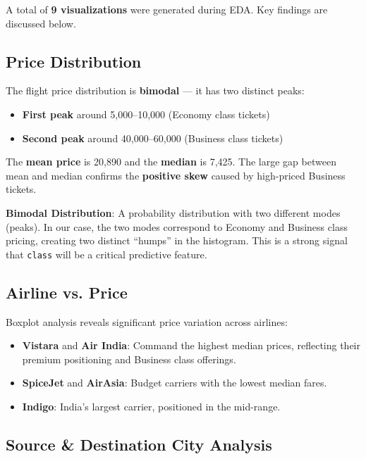 \documentclass[12pt, a4paper]{article}
\newcommand{\rupee}{\text{₹}}
\begin{document}
A total of \textbf{9 visualizations} were generated during EDA. Key findings are discussed below.

\subsection{Price Distribution}

The flight price distribution is \textbf{bimodal} — it has two distinct peaks:
\begin{itemize}[leftmargin=*]
    \item \textbf{First peak} around \rupee5,000--\rupee10,000 (Economy class tickets)
    \item \textbf{Second peak} around \rupee40,000--\rupee60,000 (Business class tickets)
\end{itemize}

The \textbf{mean price} is \rupee20,890 and the \textbf{median} is \rupee7,425. The large gap between mean and median confirms the \textbf{positive skew} caused by high-priced Business tickets.

\begin{keyterm}
\textbf{Bimodal Distribution}: A probability distribution with two different modes (peaks). In our case, the two modes correspond to Economy and Business class pricing, creating two distinct ``humps'' in the histogram. This is a strong signal that \texttt{class} will be a critical predictive feature.
\end{keyterm}

\subsection{Airline vs. Price}

Boxplot analysis reveals significant price variation across airlines:
\begin{itemize}[leftmargin=*]
    \item \textbf{Vistara} and \textbf{Air India}: Command the highest median prices, reflecting their premium positioning and Business class offerings.
    \item \textbf{SpiceJet} and \textbf{AirAsia}: Budget carriers with the lowest median fares.
    \item \textbf{Indigo}: India's largest carrier, positioned in the mid-range.
\end{itemize}

\subsection{Source \& Destination City Analysis}
\end{document}

